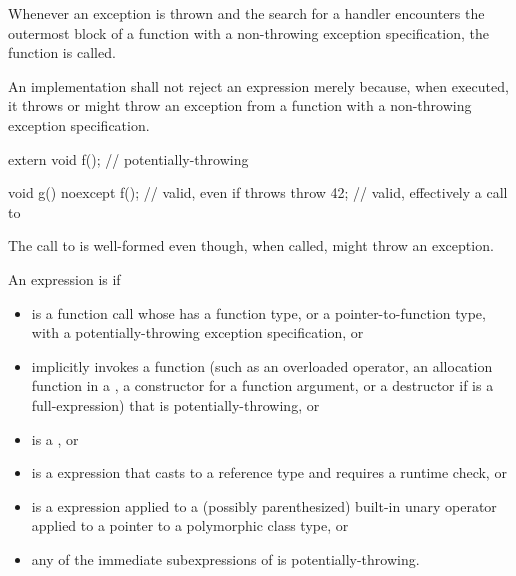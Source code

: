 \pnum
{}%
%
Whenever an exception is thrown
and the search for a handler
encounters the outermost block of a function with a
non-throwing exception specification,
the function  is called.
\begin{note}
An implementation shall not reject an expression merely because, when
executed, it throws or might
throw an exception from a function with a non-throwing exception specification.
\end{note}
\begin{example}
\begin{codeblock}
extern void f();                // potentially-throwing

void g() noexcept {
  f();                          // valid, even if  throws
  throw 42;                     // valid, effectively a call to 
}
\end{codeblock}
The call to
is well-formed even though, when called,
might throw an exception.
\end{example}

\pnum
An expression  is
 if

\begin{itemize}
\item
{} is a function call
whose 
has a function type,
or a pointer-to-function type,
with a potentially-throwing exception specification,
or
\item
{} implicitly invokes a function
(such as an overloaded operator,
an allocation function in a ,
a constructor for a function argument,
or a destructor if  is a full-expression)
that is potentially-throwing,
or
\item
{} is a ,
or
\item
{} is a  expression that casts to a reference type and
requires a runtime check,
or
\item
{} is a  expression applied to a
(possibly parenthesized) built-in unary \tcode{*} operator
applied to a pointer to a
polymorphic class type,
or
\item
any of the immediate subexpressions
of  is potentially-throwing.
\end{itemize}

